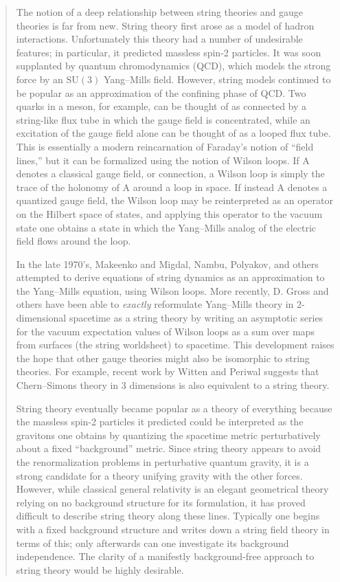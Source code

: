\documentclass{article}
\begin{document}
\begin{quote}
The notion of a deep relationship between string theories and gauge
theories is far from new. String theory first arose as a model of hadron
interactions. Unfortunately this theory had a number of undesirable
features; in particular, it predicted massless spin-2 particles. It was
soon supplanted by quantum chromodynamics (QCD), which models the strong
force by an \(\mathrm{SU}(3)\) Yang--Mills field. However, string models
continued to be popular as an approximation of the confining phase of
QCD. Two quarks in a meson, for example, can be thought of as connected
by a string-like flux tube in which the gauge field is concentrated,
while an excitation of the gauge field alone can be thought of as a
looped flux tube. This is essentially a modern reincarnation of
Faraday's notion of ``field lines,'' but it can be formalized using the
notion of Wilson loops. If A denotes a classical gauge field, or
connection, a Wilson loop is simply the trace of the holonomy of A
around a loop in space. If instead A denotes a quantized gauge field,
the Wilson loop may be reinterpreted as an operator on the Hilbert space
of states, and applying this operator to the vacuum state one obtains a
state in which the Yang--Mills analog of the electric field flows around
the loop.

In the late 1970's, Makeenko and Migdal, Nambu, Polyakov, and others
attempted to derive equations of string dynamics as an approximation to
the Yang--Mills equation, using Wilson loops. More recently, D. Gross and
others have been able to \emph{exactly} reformulate Yang--Mills theory in
\(2\)-dimensional spacetime as a string theory by writing an asymptotic
series for the vacuum expectation values of Wilson loops as a sum over
maps from surfaces (the string worldsheet) to spacetime. This
development raises the hope that other gauge theories might also be
isomorphic to string theories. For example, recent work by Witten and
Periwal suggests that Chern--Simons theory in 3 dimensions is also
equivalent to a string theory.

String theory eventually became popular as a theory of everything
because the massless spin-2 particles it predicted could be interpreted
as the gravitons one obtains by quantizing the spacetime metric
perturbatively about a fixed ``background'' metric. Since string theory
appears to avoid the renormalization problems in perturbative quantum
gravity, it is a strong candidate for a theory unifying gravity with the
other forces. However, while classical general relativity is an elegant
geometrical theory relying on no background structure for its
formulation, it has proved difficult to describe string theory along
these lines. Typically one begins with a fixed background structure and
writes down a string field theory in terms of this; only afterwards can
one investigate its background independence. The clarity of a manifestly
background-free approach to string theory would be highly desirable.


\end{quote}
\end{document}
